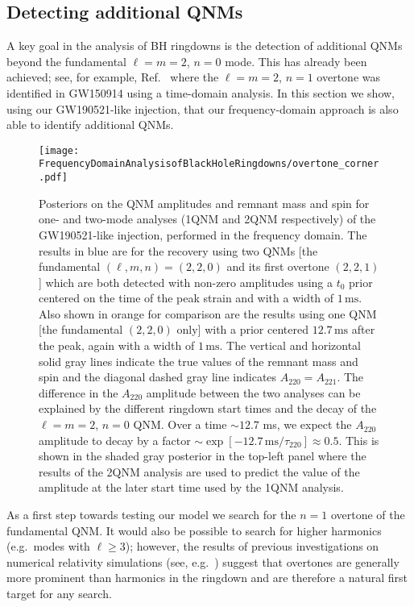 \subsection{Detecting additional QNMs}\label{subsec:overtones}

A key goal in the analysis of BH ringdowns is the detection of additional QNMs beyond the fundamental $\ell=m=2$, $n=0$ mode.
This has already been achieved; see, for example, Ref.~\cite{Isi:2019aib} where the $\ell=m=2$, $n=1$ overtone was identified in GW150914 using a time-domain analysis.
In this section we show, using our GW190521-like injection, that our frequency-domain approach is also able to identify additional QNMs.

\begin{figure*}
	\centering
	\texttt{[image: FrequencyDomainAnalysisofBlackHoleRingdowns/overtone\_corner.pdf]}
	\caption[Posteriors on the QNM amplitudes and remnant mass and spin for one- and two-mode analyses of a GW190521-like injection]{ 
		Posteriors on the QNM amplitudes and remnant mass and spin for one- and two-mode analyses (1QNM and 2QNM respectively) of the GW190521-like injection, performed in the frequency domain.
		The results in blue are for the recovery using two QNMs [the fundamental $(\ell,m,n)=(2,2,0)$ and its first overtone $(2,2,1)$] which are both detected with non-zero amplitudes using a $t_0$ prior centered on the time of the peak strain and with a width of $1\,\mathrm{ms}$.
		Also shown in orange for comparison are the results using one QNM [the fundamental $(2,2,0)$ only] with a prior centered $12.7\,\mathrm{ms}$ after the peak, again with a width of $1\,\mathrm{ms}$.
		The vertical and horizontal solid gray lines indicate the true values of the remnant mass and spin and the diagonal dashed gray line indicates $A_{220}=A_{221}$.
		The difference in the $A_{220}$ amplitude between the two analyses can be explained by the different ringdown start times and the decay of the $\ell = m = 2$, $n = 0$ QNM.
		Over a time $\sim 12.7$ ms, we expect the $A_{220}$ amplitude to decay by a factor $\sim \exp[-12.7\,\mathrm{ms}/\tau_{220}] \approx 0.5$.
		This is shown in the shaded gray posterior in the top-left panel where the results of the 2QNM analysis are used to predict the value of the amplitude at the later start time used by the 1QNM analysis.
	}
	\label{fig:overtone_corner}
\end{figure*}

As a first step towards testing our model we search for the $n=1$ overtone of the fundamental QNM.
It would also be possible to search for higher harmonics (e.g.\ modes with $\ell\geq 3$); however, the results of previous investigations on numerical relativity simulations (see, e.g.\ \cite{Giesler:2019uxc, Ota:2019bzl, Dhani:2020nik, Finch:2021iip}) suggest that overtones are generally more prominent than harmonics in the ringdown and are therefore a natural first target for any search.

